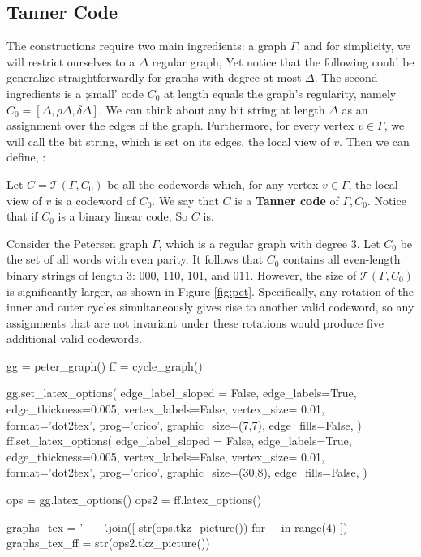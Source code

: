 \subsection{Tanner Code}
The constructions require two main ingredients: a graph $\Gamma$, and for simplicity, we will restrict ourselves to a $\Delta$ regular graph, Yet notice that the following could be generalize straightforwardly for graphs with degree at most $\Delta$. The second ingredients is a ;small' code $C_{0}$ at length equals the graph's regularity, namely $C_{0} = [\Delta,\rho\Delta, \delta\Delta]$. We can think about any bit string at length $\Delta$ as an assignment over the edges of the graph. Furthermore, for every vertex $v \in \Gamma$, we will call the bit string, which is set on its edges, the local view of $v$. Then we can define, \cite{Tanner}:
  \begin{definition}  Let $ C = \mathcal{T}\left( \Gamma, C_{0} \right)$  be all the codewords which, for any vertex $v\in \Gamma$, the local view of $v$ is a codeword of $C_{0}$. We say that $C$ is a \textbf{Tanner code}\label{Tan} of $\Gamma, C_{0}$. Notice that if $C_{0}$ is a binary linear code, So $C$ is.  
  \end{definition}
  \begin{example}
Consider the Petersen graph $\Gamma$, which is a regular graph with degree $3$. Let $C_{0}$ be the set of all words with even parity. It follows that $C_{0}$ contains all even-length binary strings of length $3$: $000$, $110$, $101$, and $011$. However, the size of $\mathcal{T}(\Gamma, C_{0})$ is significantly larger, as shown in Figure \cref{fig:pet}. Specifically, any rotation of the inner and outer cycles simultaneously gives rise to another valid codeword, so any assignments that are not invariant under these rotations would produce five additional valid codewords.

  \end{example}
\begin{sagesilent}
   
  
gg = peter_graph()
ff = cycle_graph()

gg.set_latex_options(
          edge_label_sloped = False,
          edge_labels=True,
          edge_thickness=0.005,
          vertex_labels=False,
          vertex_size= 0.01,
          format='dot2tex',
          prog='crico',
          graphic_size=(7,7),
          edge_fills=False,
      )
ff.set_latex_options(
          edge_label_sloped = False,
          edge_labels=True,
          edge_thickness=0.005,
          vertex_labels=False,
          vertex_size= 0.01,
          format='dot2tex',
          prog='crico',
          graphic_size=(30,8),
          edge_fills=False,
      )
 
ops = gg.latex_options()
ops2 = ff.latex_options()

graphs_tex =  ' \ \ \  '.join([  str(ops.tkz_picture())  for _ in range(4) ])
graphs_tex_ff  = str(ops2.tkz_picture())
\end{sagesilent}

